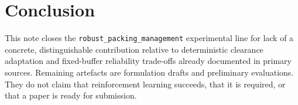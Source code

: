 \section{Conclusion}

This note closes the \texttt{robust\_packing\_management} experimental line for
lack of a concrete, distinguishable contribution relative to deterministic
clearance adaptation and fixed-buffer reliability trade-offs already documented
in primary sources. Remaining artefacts are formulation drafts and preliminary
evaluations. They do not claim that reinforcement learning succeeds, that it is
required, or that a paper is ready for submission.

